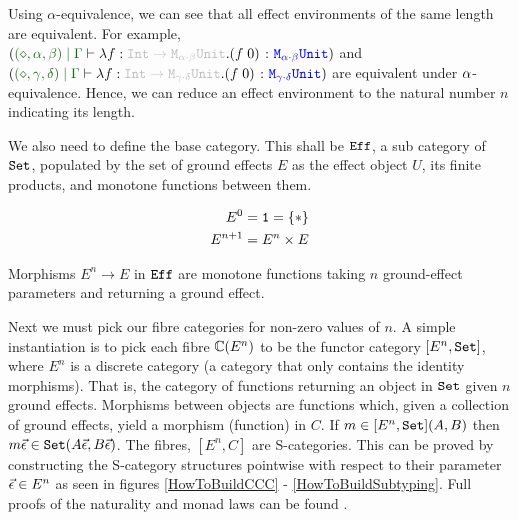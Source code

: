 \documentclass{Report}
\begin{document}
Using $\alpha$-equivalence, we can see that all effect environments of the same length are equivalent. For example, $(\etyperelation{(\nil, \a, \b)}{\G}{\lam{f}{\fntype{\texttt{Int}}{\M{\a\dot\b}{\U}}}{(\apply{f}{0})}}{\M{\a\dot\b}{\U}})$ and $(\etyperelation{(\nil, \g, \d)}{\G}{\lam{f}{\fntype{\texttt{Int}}{\M{\g\dot\d}{\U}}}{(\apply{f}{0})}}{\M{\g\dot\d}{\U}})$ are equivalent under $\alpha$-equivalence. Hence, we can reduce an effect environment to the natural number $n$ indicating its length.


We also need to define the base category. This shall be $\texttt{Eff}$, a sub category of $\texttt{Set}$, populated by the set of ground effects $E$ as the effect object $U$, its finite products, and monotone functions between them.

\begin{align*}
    E^0 & = \texttt{1} = \left\{\ast\right\}\\
    E^{n+1} &= E^n \times E
\end{align*}

Morphisms $E^n \rightarrow E$ in $\texttt{Eff}$ are monotone functions taking $n$ ground-effect parameters and returning a ground effect.

Next we must pick our fibre categories for non-zero values of $n$. A simple instantiation is to pick each fibre $\mathbb{C}(E^n)$ to be the functor category $[E^n, \texttt{Set}]$,  where $E^n$ is a discrete category (a category that only contains the identity morphisms). That is, the category of functions returning an object in $\texttt{Set}$ given $n$ ground effects. Morphisms between objects are functions which, given a collection of ground effects, yield a morphism (function) in $C$. If $m\in [E^n, \texttt{Set}](A, B)$ then $m\vec{\epsilon}\in\texttt{Set}(A\vec{\epsilon}, B\vec{\epsilon})$. The fibres, $[E^n, C]$ are S-categories. This can be proved by constructing the S-category structures pointwise with respect to their parameter $\vec{\epsilon} \in E^n$ as seen in figures \ref{HowToBuildCCC} - \ref{HowToBuildSubtyping}. Full proofs of the naturality and monad laws can be found \needsRef{}.
\end{document}
